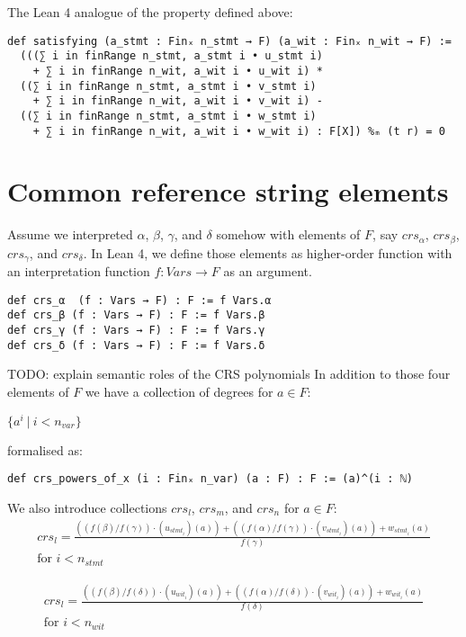 \documentclass{article}
\theoremstyle{definition}
\theoremstyle{remark}
\begin{document}
The Lean 4 analogue of the property defined above:
\begin{lstlisting}
def satisfying (a_stmt : Finₓ n_stmt → F) (a_wit : Finₓ n_wit → F) :=
  (((∑ i in finRange n_stmt, a_stmt i • u_stmt i)
    + ∑ i in finRange n_wit, a_wit i • u_wit i) *
  ((∑ i in finRange n_stmt, a_stmt i • v_stmt i)
    + ∑ i in finRange n_wit, a_wit i • v_wit i) -
  ((∑ i in finRange n_stmt, a_stmt i • w_stmt i)
    + ∑ i in finRange n_wit, a_wit i • w_wit i) : F[X]) %ₘ (t r) = 0
\end{lstlisting}

\section{Common reference string elements}

Assume we interpreted $\alpha$, $\beta$, $\gamma$, and $\delta$ somehow with elements of $F$, 
say $crs_{\alpha}$, $crs_{\beta}$, $crs_{\gamma}$, and $crs_{\delta}$.
In Lean 4, we define those elements as higher-order function with an interpretation function 
$f : Vars \to F$ as an argument.

\begin{lstlisting}
def crs_α  (f : Vars → F) : F := f Vars.α
def crs_β (f : Vars → F) : F := f Vars.β
def crs_γ (f : Vars → F) : F := f Vars.γ
def crs_δ (f : Vars → F) : F := f Vars.δ
\end{lstlisting}

TODO: explain semantic roles of the CRS polynomials
In addition to those four elements of $F$ we have a collection of degrees for $a \in F$:
\begin{center}
$\{ a^i \: | \: i < n_{var} \}$
\end{center}
formalised as:
\begin{lstlisting}
def crs_powers_of_x (i : Finₓ n_var) (a : F) : F := (a)^(i : ℕ)
\end{lstlisting}

We also introduce collections $crs_l$, $crs_m$, and $crs_n$ for $a \in F$:
\begin{multline}
crs_l = \frac{((f(\beta) / f(\gamma)) \cdot (u_{{stmt}_i})(a)) + ((f(\alpha) / f(\gamma)) \cdot (v_{{stmt}_i})(a)) + w_{{stmt}_i}(a)}{f(\gamma)} \\ \text{for $i < n_{stmt}$}
\end{multline}

\begin{multline}
crs_l = \frac{((f(\beta) / f(\delta)) \cdot (u_{{wit}_i})(a)) + ((f(\alpha) / f(\delta)) \cdot (v_{{wit}_i})(a)) + w_{{wit}_i}(a)}{f(\delta)} \\ \text{for $i < n_{wit}$}
\end{multline}
\end{document}

